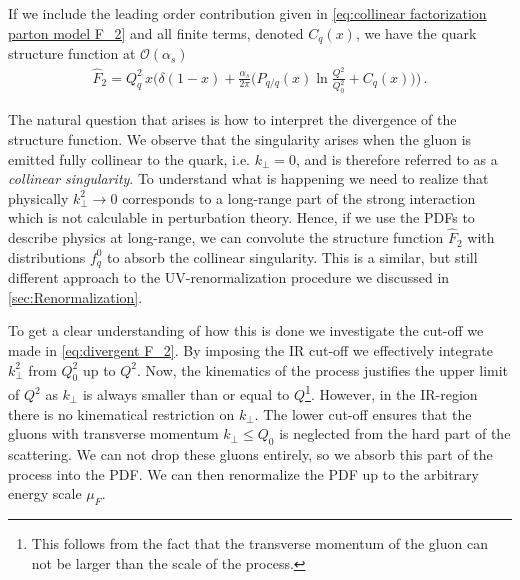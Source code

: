 If we include the leading order contribution given in \cref{eq:collinear factorization parton model F_2} and all finite terms, denoted $C_{q}(x)$, we have the quark structure function at $\mathcal{O}(\alpha_s)$
\begin{align}\label{eq:quark structure function correction}
    \hat{F}_{2}=Q_{q}^{2}\,x\Big(\delta(1-x)+\frac{\alpha_s}{2\pi}\big(P_{q/q}(x)\ln{\frac{Q^{2}}{Q_{0}^{2}}}+C_{q}(x)\big)\Big)\,.
\end{align}

The natural question that arises is how to interpret the divergence of the structure function. We observe that the singularity arises when the gluon is emitted fully collinear to the quark, i.e. $k_{\perp}=0$, and is therefore referred to as a \emph{collinear singularity}. To understand what is happening we need to realize that physically $k_{\perp}^{2}\rightarrow 0$ corresponds to a long-range part of the strong interaction which is not calculable in perturbation theory. Hence, if we use the PDFs to describe physics at long-range, we can convolute the structure function $\hat{F}_{2}$ with  distributions $f_{q}^{0}$ to absorb the collinear singularity. This is a similar, but still different approach to the UV-renormalization procedure we discussed in \cref{sec:Renormalization}.

To get a clear understanding of how this is done we investigate the cut-off we made in \cref{eq:divergent F_2}. By imposing the IR cut-off we effectively integrate $k_{\perp}^{2}$ from $Q_{0}^{2}$ up to $Q^{2}$. Now, the kinematics of the process justifies the upper limit of $Q^{2}$ as $k_{\perp}$ is always smaller than or equal to $Q$\footnote{This follows from the fact that the transverse momentum of the gluon can not be larger than the scale of the process.}. However, in the IR-region there is no kinematical restriction on $k_{\perp}$. The lower cut-off ensures that the gluons with transverse momentum $k_{\perp}\leq Q_{0}$ is neglected from the hard part of the scattering. We can not drop these gluons entirely, so we absorb this part of the process into the PDF. We can then renormalize the PDF up to the arbitrary energy scale $\mu_F$.

